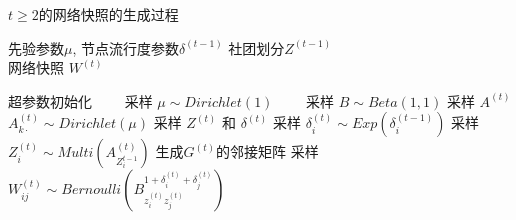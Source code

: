 




\begin{algorithm}[H]
\caption{$t \ge 2$的网络快照的生成过程}\label{gent2}
\algorithmicrequire \; 先验参数$\mu$, 节点流行度参数$\delta^{(t-1)}$ 社团划分$Z^{(t-1)}$ \\
\algorithmicensure \; 网络快照 $W^{(t)}$
\begin{algorithmic}[1]
\STATE 超参数初始化
\STATE ~~~~采样 $\mu \sim Dirichlet (1)$ 
\STATE ~~~~采样 $B \sim Beta(1,1)$
\STATE 采样 $A^{(t)}$
\STATE $A^{(t)}_{k\cdot} \sim Dirichlet(\mu)$
\ENDFOR
\STATE 采样 $Z^{(t)}$ 和 $\delta^{(t)}$
\STATE 采样 $\delta^{(t)}_i \sim Exp(\delta^{(t-1)}_i)$
\STATE 采样 $Z^{(t)}_i \sim Multi(A^{(t)}_{Z_i^{t-1}})$
\ENDFOR
\STATE 生成$G^{(t)}的邻接矩阵$
\STATE 采样 $W^{(t)}_{ij} \sim Bernoulli(B_{z_i^{(t)} z_j^{(t)}}^{1+\delta_i^{(t)} + \delta_j^{(t)}})$
\ENDFOR
\end{algorithmic}
\end{algorithm}


